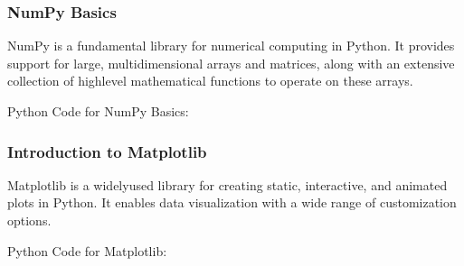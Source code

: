 \documentclass[letterpaper,10pt,english]{sphinxmanual}
\begin{document}
\subsubsection{NumPy Basics}
\label{\detokenize{basics/basics:numpy-basics}}
\sphinxAtStartPar
NumPy is a fundamental library for numerical computing in Python. It provides support for large, multi\sphinxhyphen{}dimensional arrays and matrices, along with an extensive collection of high\sphinxhyphen{}level mathematical functions to operate on these arrays.

\sphinxAtStartPar
Python Code for NumPy Basics:

\begin{sphinxVerbatim}[commandchars=\\\{\}]
   

  \PYG{p}{[}    \PYG{p}{]}
    
   
   

    
   
\end{sphinxVerbatim}


\subsubsection{Introduction to Matplotlib}
\label{\detokenize{basics/basics:introduction-to-matplotlib}}
\sphinxAtStartPar
Matplotlib is a widely\sphinxhyphen{}used library for creating static, interactive, and animated plots in Python. It enables data visualization with a wide range of customization options.

\sphinxAtStartPar
Python Code for Matplotlib:
\end{document}

